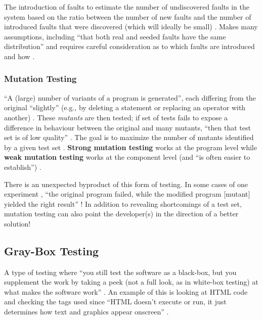 The introduction of faults to estimate the number of undiscovered faults in the
system based on the ratio between the number of new faults and the number of
introduced faults that were discovered (which will ideally be small)
\cite[p.~427]{van_vliet_software_2000}. Makes many assumptions, including
``that both real and seeded faults have the same distribution'' and requires
careful consideration as to which faults are introduced and how
\cite[p.~427]{van_vliet_software_2000}.

\subsubsection{Mutation Testing \cite[pp.~428-429]{van_vliet_software_2000}}
\label{chap:notes:sec:mutation-testing}

``A (large) number of variants of a program is generated'', each differing from
the original ``slightly'' (e.g., by deleting a statement or replacing an
operator with another) \cite[p.~428]{van_vliet_software_2000}. These
\emph{mutants} are then tested; if set of tests fails to expose a difference in
behaviour between the original and many mutants, ``then that test set is of low
quality'' \cite[pp.~428-429]{van_vliet_software_2000}. The goal is to maximize
the number of mutants identified by a given test set
\cite[p.~429]{van_vliet_software_2000}. \textbf{Strong mutation testing} works
at the program level while \textbf{weak mutation testing} works at the
component level (and ``is often easier to establish'')
\cite[p.~429]{van_vliet_software_2000}.

There is an unexpected byproduct of this form of testing. In some cases of one
experiment , ``the original program failed,
while the modified program [mutant] yielded the right result''
\cite[p.~432]{van_vliet_software_2000}! In addition to revealing shortcomings
of a test set, mutation testing can also point the developer(s) in the
direction of a better solution!

\subsection{Gray-Box Testing \cite[pp.~218-220]{patton_software_2006}}
A type of testing where ``you still test the software as a black-box, but you
supplement the work by taking a peek (not a full look, as in white-box testing)
at what makes the software work'' \cite[p.~218]{patton_software_2006}. An
example of this is looking at HTML code and checking the tags used since
``HTML doesn't execute or run, it just determines how text and graphics appear
onscreen'' \cite[p.~220]{patton_software_2006}.


